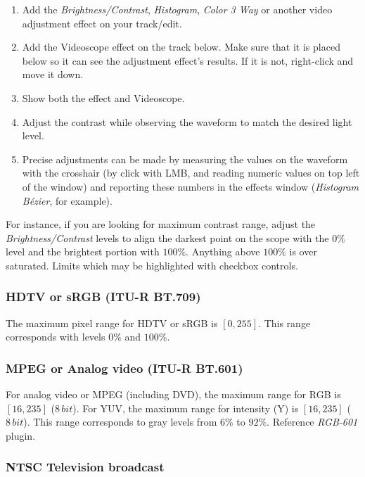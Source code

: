 {\begin{enumerate}
    \item Add the \textit{Brightness/Contrast}, \textit{Histogram}, \textit{Color 3 Way} or another video adjustment effect on your track/edit.
    \item Add the Videoscope effect on the track below. Make sure that it is placed below so it can see the adjustment effect's results. If it is not, right-click and move it down.
    \item Show both the effect and Videoscope.
    \item Adjust the contrast while observing the waveform to match the desired light level.
    \item Precise adjustments can be made by measuring the values on the waveform with the crosshair (by click with LMB, and reading numeric values on top left of the window) and reporting these numbers in the effects window (\textit{Histogram Bézier}, for example).
\end{enumerate}

For instance, if you are looking for maximum contrast range, adjust the \textit{Brightness/Contrast} levels to align the darkest point on the scope with the $0\%$ level and the brightest portion with $100\%$. Anything above $100\%$ is over saturated. Limits which may be highlighted with checkbox controls.

\subsubsection*{HDTV or sRGB (ITU-R BT.709)}%
\label{ssub:hdtv_srgb_bt709}

The maximum pixel range for HDTV or sRGB is $[0, 255]$. This range corresponds with levels $0\%$ and $100\%$.

\subsubsection*{MPEG or Analog video (ITU-R BT.601)}%
\label{ssub:mpeg_analog_video_bt601}

For analog video or MPEG (including DVD), the maximum range for RGB is $[16, 235]$ ($8\, bit$). For YUV, the maximum range for intensity (Y) is $[16, 235]$ ($8\, bit$). This range corresponds to gray levels from $6\%$ to $92\%$. Reference \textit{RGB-601} plugin.

\subsubsection*{NTSC Television broadcast}%
\label{ssub:ntsc_television_broadcast}

}
